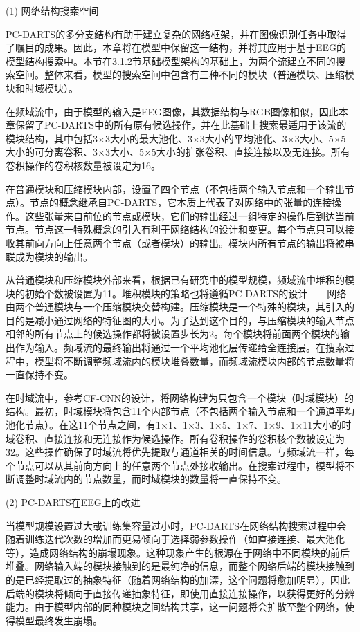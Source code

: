 (1) 网络结构搜索空间

PC-DARTS的多分支结构有助于建立复杂的网络框架，并在图像识别任务中取得了瞩目的成果。因此，本章将在模型中保留这一结构，并将其应用于基于EEG的模型结构搜索中。本节在3.1.2节基础模型架构的基础上，为两个流建立不同的搜索空间。整体来看，模型的搜索空间中包含有三种不同的模块（普通模块、压缩模块和时域模块）。

在频域流中，由于模型的输入是EEG图像，其数据结构与RGB图像相似，因此本章保留了PC-DARTS中的所有原有候选操作，并在此基础上搜索最适用于该流的模块结构，其中包括3×3大小的最大池化、3×3大小的平均池化、3×3大小、5×5大小的可分离卷积、3×3大小、5×5大小的扩张卷积、直接连接以及无连接。所有卷积操作的卷积核数量被设定为16。

在普通模块和压缩模块内部，设置了四个节点（不包括两个输入节点和一个输出节点）。节点的概念继承自PC-DARTS，它本质上代表了对网络中的张量的连接操作。这些张量来自前位的节点或模块，它们的输出经过一组特定的操作后到达当前节点。节点这一特殊概念的引入有利于网络结构的设计和变更。每个节点只可以接收其前向方向上任意两个节点（或者模块）的输出。模块内所有节点的输出将被串联成为模块的输出。

从普通模块和压缩模块外部来看，根据已有研究中的模型规模\cite{3-3}，频域流中堆积的模块的初始个数被设置为11。堆积模块的策略也将遵循PC-DARTS的设计——网络由两个普通模块与一个压缩模块交替构建。压缩模块是一个特殊的模块，其引入的目的是减小通过网络的特征图的大小。为了达到这个目的，与压缩模块的输入节点相邻的所有节点上的候选操作都将被设置步长为2。每个模块将前面两个模块的输出作为输入。频域流的最终输出将通过一个平均池化层传递给全连接层。在搜索过程中，模型将不断调整频域流内的模块堆叠数量，而频域流模块内部的节点数量将一直保持不变。

在时域流中，参考CF-CNN的设计，将网络构建为只包含一个模块（时域模块）的结构。最初，时域模块将包含11个内部节点（不包括两个输入节点和一个通道平均池化节点）。在这11个节点之间，有1×1、1×3、1×5、1×7、1×9、1×11大小的时域卷积、直接连接和无连接作为候选操作。所有卷积操作的卷积核个数被设定为32。这些操作确保了时域流将优先提取与通道相关的时间信息。与频域流一样，每个节点可以从其前向方向上的任意两个节点处接收输出。在搜索过程中，模型将不断调整时域流内的节点数量，而时域模块的数量将一直保持不变。

(2) PC-DARTS在EEG上的改进

当模型规模设置过大或训练集容量过小时，PC-DARTS在网络结构搜索过程中会随着训练迭代次数的增加而更易倾向于选择弱参数操作（如直接连接、最大池化等），造成网络结构的崩塌现象\cite{3-9}。这种现象产生的根源在于网络中不同模块的前后堆叠。网络输入端的模块接触到的是最纯净的信息，而整个网络后端的模块接触到的是已经提取过的抽象特征（随着网络结构的加深，这个问题将愈加明显），因此后端的模块将倾向于直接传递抽象特征，即使用直接连接操作，以获得更好的分辨能力。由于模型内部的同种模块之间结构共享，这一问题将会扩散至整个网络，使得模型最终发生崩塌。

